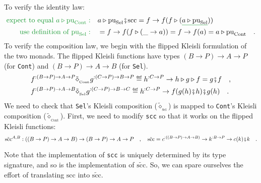 To verify the identity law:
\begin{align*}
{\color{greenunder}\text{expect to equal }a\triangleright\text{pu}_{\text{Cont}}:}\quad & a\triangleright\text{pu}_{\text{Sel}}\bef\text{scc}=f\rightarrow f(f\triangleright(\gunderline{a\triangleright\text{pu}_{\text{Sel}}}))\\
{\color{greenunder}\text{use definition of }\text{pu}_{\text{Sel}}:}\quad & =f\rightarrow f(f\triangleright(\_\rightarrow a))=f\rightarrow f(a)=a\triangleright\text{pu}_{\text{Cont}}\quad.
\end{align*}
To verify the composition law, we begin with the flipped Kleisli formulation
of the two monads. The flipped Kleisli functions have types $\left(B\rightarrow P\right)\rightarrow A\rightarrow P$
(for \lstinline!Cont!) and $\left(B\rightarrow P\right)\rightarrow A\rightarrow B$
(for \lstinline!Sel!).
\begin{align*}
 & f^{:\left(B\rightarrow P\right)\rightarrow A\rightarrow P}\tilde{\diamond}_{_{\text{Cont}}}g^{:\left(C\rightarrow P\right)\rightarrow B\rightarrow P}\triangleq h^{:C\rightarrow P}\rightarrow h\triangleright g\triangleright f=g\bef f\quad,\\
 & f^{:\left(B\rightarrow P\right)\rightarrow A\rightarrow B}\tilde{\diamond}_{_{\text{Sel}}}g^{:\left(C\rightarrow P\right)\rightarrow B\rightarrow C}\triangleq h^{:C\rightarrow P}\rightarrow f(g(h)\bef h)\bef g(h)\quad.
\end{align*}
We need to check that \lstinline!Sel!\textsf{'}s Kleisli composition ($\tilde{\diamond}_{_{\text{Sel}}}$)
is mapped to \lstinline!Cont!\textsf{'}s Kleisli composition ($\tilde{\diamond}_{_{\text{Cont}}}$).
First, we need to modify \lstinline!scc! so that it works on the
flipped Kleisli functions:
\[
\tilde{\text{scc}}^{A,B}:\left(\left(B\rightarrow P\right)\rightarrow A\rightarrow B\right)\rightarrow\left(B\rightarrow P\right)\rightarrow A\rightarrow P\quad,\quad\tilde{\text{scc}}=c^{:\left(\left(B\rightarrow P\right)\rightarrow A\rightarrow B\right)}\rightarrow k^{:B\rightarrow P}\rightarrow c(k)\bef k\quad.
\]

Note that the implementation of \lstinline!scc! is uniquely determined
by its type signature, and so is the implementation of $\tilde{\text{scc}}$.
So, we can spare ourselves the effort of translating $\text{scc}$
into $\tilde{\text{scc}}$.

